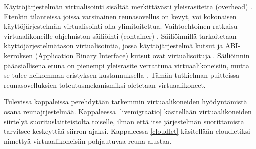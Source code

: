 Käyttöjärjestelmän virtualisointi sisältää merkittävästi yleisrasitetta (overhead) \cite{xavier2013performance}. Etenkin tilanteissa joissa varsinainen reunasovellus on kevyt, voi kokonaisen käyttöjärjestelmän virtualisointi olla ylimitoitettua. Vaihtoehtoinen ratkaisu virtuaalikoneille ohjelmiston säiliöinti (container) \cite{soltesz2007container}.
Säiliöinnillä tarkoitetaan käyttöjärjestelmätason virtualisointia, jossa käyttöjärjestelmä kutsut ja ABI-kerroksen (Application Binary Interface) kutsut ovat virtualisoituja \cite{soltesz2007container}.
Säiliöinnin pääasiallisena etuna on pienempi yleisrasite verrattuna virtuaalikoneisiin, mutta se tulee heikomman eristyksen kustannuksella \cite{soltesz2007container}.
Tämän tutkielman puitteissa reunasovelluksien toteutusmekanismiksi oletetaan virtuaalikoneet.

Tulevissa kappaleissa perehdytään tarkemmin virtuaalikoneiden hyödyntämistä osana reunajrjestelmää.
Kappaleessa \ref{livemigraatio} käsitellään virtuaalikoneiden siirtelyä suorituslaitteistolta toiselle, ilman että itse järjestelmän suorittamista tarvitsee keskeyttää siirron ajaksi. 
Kappaleessa \ref{cloudlet} käsitellään cloudletiksi nimettyä virtuaalikoneisiin pohjautuvaa reuna-alustaa.




